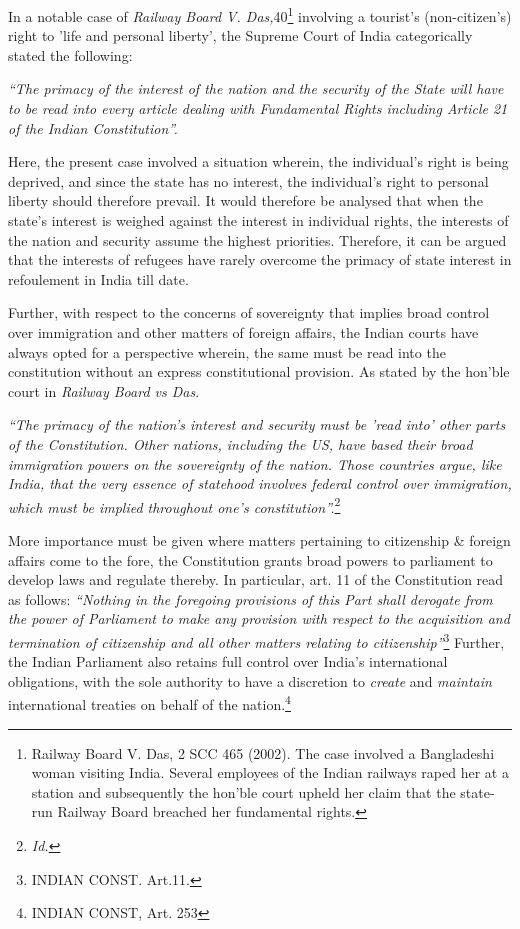 \begin{multicols}{2}
\noi
In a notable case of \textit{Railway Board V. Das,}40\footnote{Railway Board V. Das, 2 SCC 465 (2002). The case involved a Bangladeshi woman visiting India. Several employees of the Indian railways raped her at a station and subsequently the hon’ble court upheld her claim that the state-run Railway Board breached her fundamental rights.} involving a tourist's (non-citizen's) right to 'life and personal liberty', the Supreme Court of India categorically stated the following:

\noi
\textit{“The primacy of the interest of the nation and the security of the State will have to be read
into every article dealing with Fundamental Rights including Article 21 of the Indian
Constitution”.}

\noi
Here, the present case involved a situation wherein, the individual's right is being deprived,
and since the state has no interest, the individual's right to personal liberty should therefore
prevail. It would therefore be analysed that when the state's interest is weighed against the
interest in individual rights, the interests of the nation and security assume the highest
priorities. Therefore, it can be argued that the interests of refugees have rarely overcome the
primacy of state interest in refoulement in India till date.

\noi
Further, with respect to the concerns of sovereignty that implies broad control over
immigration and other matters of foreign affairs, the Indian courts have always opted for a
perspective wherein, the same must be read into the constitution without an express
constitutional provision. As stated by the hon’ble court in \textit{Railway Board vs Das}.

\noi
\textit{“The primacy of the nation's interest and security must be 'read into' other parts of the
Constitution. Other nations, including the US, have based their broad immigration powers on
the sovereignty of the nation. Those countries argue, like India, that the very essence of statehood involves federal control over immigration, which must be implied throughout one's
constitution”.}\footnote{\textit{Id.}}

\noi
More importance must be given where matters pertaining to citizenship \& foreign affairs
come to the fore, the Constitution grants broad powers to parliament to develop laws and
regulate thereby. In particular, art. 11 of the Constitution read as follows: \textit{“Nothing in the
foregoing provisions of this Part shall derogate from the power of Parliament to make any
provision with respect to the acquisition and termination of citizenship and all other matters
relating to citizenship”}\footnote{INDIAN CONST. Art.11.} Further, the Indian Parliament also retains full control over India's
international obligations, with the sole authority to have a discretion to \textit{create} and \textit{maintain}
international treaties on behalf of the nation.\footnote{INDIAN CONST, Art. 253}


\end{multicols}

